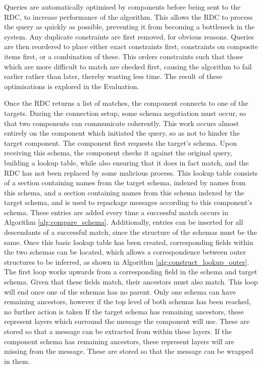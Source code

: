 \documentclass[12pt,twoside,notitlepage]{report}
\begin{document}
Queries are automatically optimised by components before being sent to the RDC, to increase performance of the algorithm. This allows the RDC to process the query as quickly as possible, preventing it from becoming a bottleneck in the system. 
Any duplicate constraints are first removed, for obvious reasons. 
Queries are then reordered to place either exact constraints first, constraints on composite items first, or a combination of these. 
This orders constraints such that those which are more difficult to match are checked first, causing the algorithm to fail earlier rather than later, thereby wasting less time. 
The result of these optimisations is explored in the Evaluation. 


Once the RDC returns a list of matches, the component connects to one of the targets. 
During the connection setup, some schema negotiation must occur, so that two components can communicate coherently. 
This work occurs almost entirely on the component which initiated the query, so as not to hinder the target component. 
The component first requests the target's schema. 
Upon receiving this schema, the component checks it against the original query, building a lookup table, while also ensuring that it does in fact match, and the RDC has not been replaced by some malicious process. 
This lookup table consists of a section containing names from the target schema, indexed by names from this schema, and a section containing names from this schema indexed by the target schema, and is used to repackage messages according to this component's schema. 
These entries are added every time a successful match occurs in Algorithm \ref{alg:compare_schema}. 
Additionally, entries can be inserted for all descendants of a successful match, since the structure of the schemas must be the same. 
Once this basic lookup table has been created, corresponding fields within the two schemas can be located, which allows a correspondence between outer structures to be inferred, as shown in Algorithm \ref{alg:construct_lookup_outer}. 
The first loop works upwards from a corresponding field in the schema and target schema. 
Given that these fields match, their ancestors must also match. 
This loop will end once one of the schemas has no parent. 
Only one schema can have remaining ancestors, however if the top level of both schemas has been reached, no further action is taken
If the target schema has remaining ancestors, these represent layers which surround the message the component will use. 
These are stored so that a message can be extracted from within these layers. 
If the component schema has remaining ancestors, these represent layers will are missing from the message. 
These are stored so that the message can be wrapped in them. 
\end{document}
